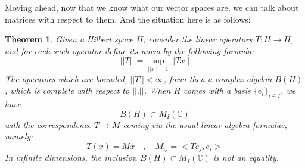 \documentclass[12pt]{amsbook}
\newtheorem{theorem}{Theorem}[chapter]
\begin{document}
Moving ahead, now that we know what our vector spaces are, we can talk about matrices with respect to them. And the situation here is as follows:


\begin{theorem}
Given a Hilbert space $H$, consider the linear operators $T:H\to H$, and for each such operator define its norm by the following formula:
$$||T||=\sup_{||x||=1}||Tx||$$
The operators which are bounded, $||T||<\infty$, form then a complex algebra $B(H)$, which is complete with respect to $||.||$. When $H$ comes with a basis $\{e_i\}_{i\in I}$, we have
$$B(H)\subset M_I(\mathbb C)$$
with the correspondence $T\to M$ coming via the usual linear algebra formulae, namely:
$$T(x)=Mx\quad,\quad M_{ij}=<Te_j,e_i>$$
In infinite dimensions, the inclusion $B(H)\subset M_I(\mathbb C)$ is not an equality.
\end{theorem}
\end{document}
